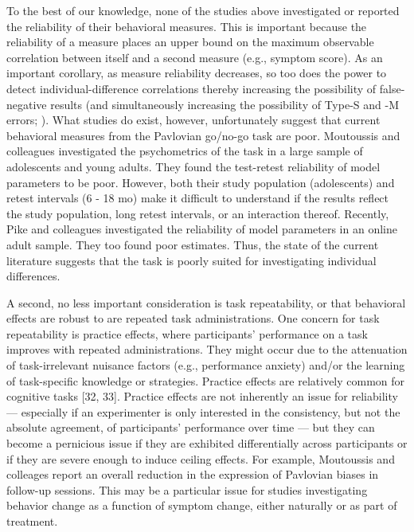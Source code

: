 \documentclass[a4paper,12pt]{article}
\begin{document}
\begin{refsection}[main]
To the best of our knowledge, none of the studies above investigated or reported the reliability of their behavioral measures. This is important because the reliability of a measure places an upper bound on the maximum observable correlation between itself and a second measure (e.g., symptom score). As an important corollary, as measure reliability decreases, so too does the power to detect individual-difference correlations \cite{Parsons2019-jw} thereby increasing the possibility of false-negative results (and simultaneously increasing the possibility of Type-S and -M errors; \cite{gelman2014beyond}). What studies do exist, however, unfortunately suggest that current behavioral measures from the Pavlovian go/no-go task are poor. Moutoussis and colleagues \cite{moutoussis2018change} investigated the psychometrics of the task in a large sample of adolescents and young adults. They found the test-retest reliability of model parameters to be poor. However, both their study population (adolescents) and retest intervals (6 - 18 mo) make it difficult to understand if the results reflect the study population, long retest intervals, or an interaction thereof. Recently, Pike and colleagues \cite{pike2022test} investigated the reliability of model parameters in an online adult sample. They too found poor estimates. Thus, the state of the current literature suggests that the task is poorly suited for investigating individual differences. 

A second, no less important consideration is task repeatability, or that behavioral effects are robust to are repeated task administrations. One concern for task repeatability is practice effects, where participants’ performance on a task improves with repeated administrations. They might occur due to the attenuation of task-irrelevant nuisance factors (e.g., performance anxiety) and/or the learning of task-specific knowledge or strategies. Practice effects are relatively common for cognitive tasks [32, 33]. Practice effects are not inherently an issue for reliability — especially if an experimenter is only interested in the consistency, but not the absolute agreement, of participants’ performance over time — but they can become a pernicious issue if they are exhibited differentially across participants or if they are severe enough to induce ceiling effects. For example, Moutoussis and colleages report an overall reduction in the expression of Pavlovian biases in follow-up sessions. This may be a particular issue for studies investigating behavior change as a function of symptom change, either naturally or as part of treatment.


\end{refsection}
\end{document}
